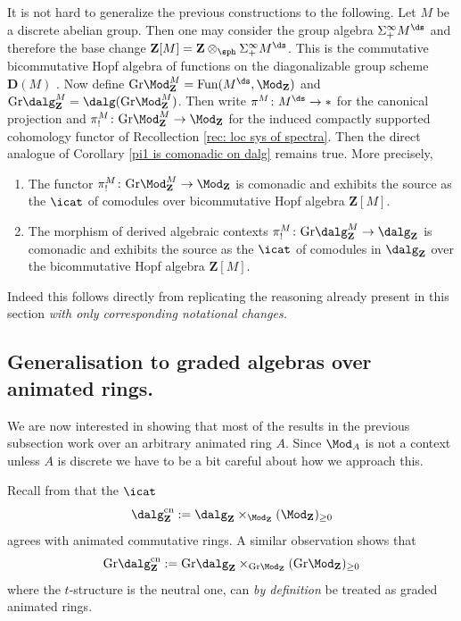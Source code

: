 \documentclass[10pt,reqno]{amsart}
\numberwithin{equation}{section}
\newcommand{\ZZ}{\mathbf{Z}}
\newcommand{\Fun}{\mathrm{Fun}}
\newcommand{\Gr}{\mathrm{Gr}}
\newcommand{\cn}{\mathrm{cn}}
\begin{document}
\begin{remark}\label{remark: remark on diagonalizable coactions}
    It is not hard to generalize the previous constructions to the following. Let $M$ be a discrete abelian group. Then one may consider the group algebra $\Sigma^\infty_{+} M^{\ds}$ and therefore the base change $\ZZ[M]=\ZZ\otimes_{\sph} \Sigma^\infty_{+} M^{\ds}$. This is the commutative bicommutative Hopf algebra of functions on the diagonalizable group scheme $\mathbf{D}(M)$ \cite[\S~2.6]{Tate1997FiniteFlatGroupSchemes}. Now define $\Gr\Mod^M_\ZZ=\Fun(M^\ds,\Mod_\ZZ)$ and $\Gr\dalg^M_\ZZ=\dalg(\Gr\Mod^M_\ZZ)$. Then write $\pi^M\colon M^\ds\to *$ for the canonical projection and $\pi_!^M\colon \Gr\Mod_{\ZZ}^M\to \Mod_\ZZ$ for the induced compactly supported cohomology functor of  Recollection \ref{rec: loc sys of spectra}. Then the direct analogue of Corollary \ref{pi1 is comonadic on dalg} remains true. More precisely, 
    \begin{enumerate}
        
        \item The functor $\pi_!^M\colon \Gr\Mod_\ZZ^M\to \Mod_\ZZ$ is comonadic and exhibits the source as the $\icat$ of comodules over bicommutative Hopf algebra $\ZZ[M]$. 
        \item The morphism of derived algebraic contexts $\pi_!^M\colon \Gr\dalg_\ZZ^M\to \dalg_\ZZ$ is comonadic and exhibits the source as the $\icat$ of comodules in $\dalg_\ZZ$ over the bicommutative Hopf algebra $\ZZ[M].$
    \end{enumerate}
    Indeed this follows directly from replicating the reasoning already present in this section \emph{with only corresponding notational changes.}
\end{remark}
    

\subsection{Generalisation to graded algebras over animated rings.}\label{ssec: generalisation to graded algebras}

We are now interested in showing that most of the results in the previous subsection work over an arbitrary animated ring $A$. Since $\Mod_A$ is not a context unless $A$ is discrete we have to be a bit careful about how we approach this.

\begin{remark}\label{remark: identify animated with connective dalg}
    Recall from \cite[Remark 4.3.3]{Rak20} that the $\icat$ $$\dalg_\ZZ^\cn:=\dalg_\ZZ\times_{\Mod_\ZZ}(\Mod_\ZZ)_{\geq 0}$$ agrees with animated commutative rings. A similar observation shows that $$\Gr\dalg_\ZZ^\cn:=\Gr\dalg_\ZZ\times_{\Gr\Mod_\ZZ}(\Gr\Mod_\ZZ)_{\geq 0}$$ where the $t$-structure is the neutral one, can \emph{by definition} be treated as graded animated rings.
\end{remark}
\end{document}
